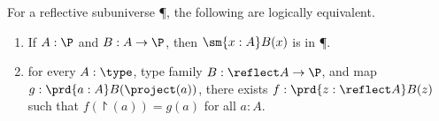 %
\begin{thm}\label{thm:modal-char}
  For a reflective subuniverse \P, the following are logically equivalent.
  \begin{enumerate}
  \item If $A:\P$ and $B:A\to \P$, then $\sm{x:A} B(x)$ is in \P.\label{item:mchr1}
  \item for every $A:\type$, type family $B:\reflect A\to\P$, and map $g:\prd{a:A} B(\project(a))$, there exists $f:\prd{z:\reflect A} B(z)$ such that $f(\project(a)) = g(a)$ for all $a:A$.\label{item:mchr2}
  \end{enumerate}
\end{thm}

